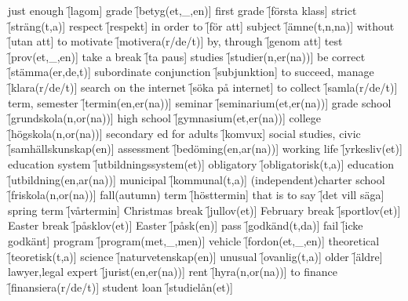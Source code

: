 \begin{questions}
    \begin{multicols}{2}
        \raggedcolumns
        \question just enough \f[lagom]
        \question grade \f[betyg(et,\_,en)]
        \question first grade \f[första klass]
        \question strict \f[sträng(t,a)]
        \question respect \f[respekt]
        \question in order to \f[för att]
        \question subject \f[ämne(t,n,na)]
        \question without \f[utan att]
        \question to motivate \f[motivera(r/de/t)]
        \question by, through \f[genom att]
        \question test \f[prov(et,\_,en)]
        \question take a break \f[ta paus]
        \question studies \f[studier(n,er(na))]
        \question be correct \f[stämma(er,de,t)]
        \question subordinate conjunction \f[subjunktion]
        \question to succeed, manage \f[klara(r/de/t)]
        \question search on the internet \f[söka på internet]
        \question to collect \f[samla(r/de/t)]
        \question term, semester \f[termin(en,er(na))]
        \question seminar \f[seminarium(et,er(na))]
        \question grade school \f[grundskola(n,or(na))]
        \question high school \f[gymnasium(et,er(na))]
        \question college \f[högskola(n,or(na))]
        \question secondary ed for adults \f[komvux]
        \question social studies, civic \f[samhällskunskap(en)]
        \question assessment \f[bedöming(en,ar(na))]
        \question working life \f[yrkesliv(et)]
        \question education system \f[utbildningssystem(et)]
        \question obligatory \f[obligatorisk(t,a)]
        \question education \f[utbildning(en,ar(na))]
        \question municipal \f[kommunal(t,a)]
        \question (independent)charter school \f[friskola(n,or(na))]
        \question fall(autumn) term \f[hösttermin]
        \question that is to say \f[det vill säga]
        \question spring term \f[vårtermin]
        \question Christmas break \f[jullov(et)]
        \question February break \f[sportlov(et)]
        \question Easter break \f[påsklov(et)]
        \question Easter \f[påsk(en)]
        \question pass \f[godkänd(t,da)]
        \question fail \f[icke godkänt]
        \question program \f[program(met,\_,men)]
        \question vehicle \f[fordon(et,\_,en)]
        \question theoretical \f[teoretisk(t,a)]
        \question science \f[naturvetenskap(en)]
        \question unusual \f[ovanlig(t,a)]
        \question older \f[äldre]
        \question lawyer,legal expert \f[jurist(en,er(na))]
        \question rent \f[hyra(n,or(na))]
        \question to finance \f[finansiera(r/de/t)]
        \question student loan \f[studielån(et)]

\end{multicols}
\end{questions}
